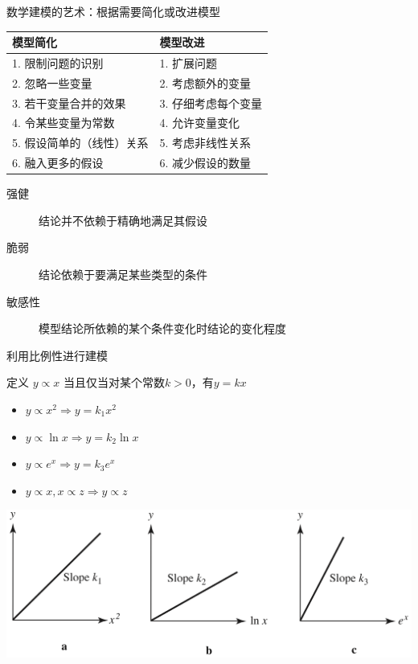 \documentclass[UTF8, mathserif]{ctexbeamer}
\begin{document}
\begin{frame}{数学建模的艺术：根据需要简化或改进模型}

  \begin{table}[ht]
    \centering
    \begin{tabular}{ll}
      模型简化 & 模型改进\\
      \hline{}
      1. 限制问题的识别 & 1. 扩展问题\\
      2. 忽略一些变量 & 2. 考虑额外的变量\\
      3. 若干变量合并的效果 & 3. 仔细考虑每个变量\\
      4. 令某些变量为常数 & 4. 允许变量变化\\
      5. 假设简单的（线性）关系 & 5. 考虑非线性关系\\
      6. 融入更多的假设 & 6. 减少假设的数量
    \end{tabular}
  \end{table}

  \begin{description}
  \item[强健] 结论并不依赖于精确地满足其假设
  \item[脆弱] 结论依赖于要满足某些类型的条件
  \item[敏感性] 模型结论所依赖的某个条件变化时结论的变化程度
  \end{description}

\end{frame}

\begin{frame}{利用比例性进行建模}
  \begin{block}{定义}
    $y \propto x$ 当且仅当对某个常数$k>0$，有$y=kx$
  \end{block}

  \begin{itemize}
  \item $y \propto x^2 \Rightarrow y=k_1x^2$
  \item $y \propto \ln x \Rightarrow y=k_2\ln x$
  \item $y \propto e^x \Rightarrow y=k_3 e^x$
  \item $y \propto x, x \propto z \Rightarrow y \propto z$
  \end{itemize}

  \begin{center}
    \includegraphics[width=.6\textwidth{}]{proptofig.png}
  \end{center}
\end{frame}
\end{document}
